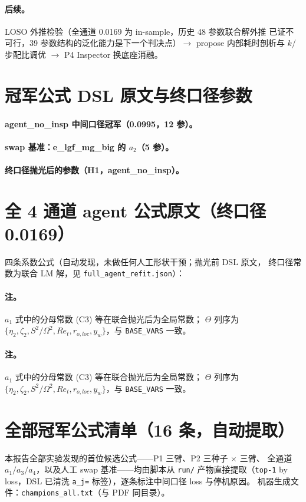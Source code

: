 \documentclass[11pt,a4paper]{ctexart}
\newcommand{\rol}{r_{o,loc}}
\newcommand{\yw}{y_w}
\newcommand{\et}{\eta_2}
\newcommand{\zt}{\zeta_2}
\newcommand{\ret}{Re_t}
\begin{document}
\paragraph{后续。}
LOSO 外推检验（全通道 0.0169 为 in-sample，历史 48 参数联合解外推
已证不可行，39 参数结构的泛化能力是下一个判决点）$\to$ propose
内部耗时剖析与 $k$/步配比调优 $\to$ P4 Inspector 换底座消融。

\appendix
\section{冠军公式 DSL 原文与终口径参数}

\paragraph{agent\_no\_insp 中间口径冠军（0.0995，12 参）。}


\paragraph{swap 基准：e\_lgf\_mg\_big 的 $a_2$（5 参）。}


\paragraph{终口径抛光后的参数（H1，agent\_no\_insp）。}


\section{全 4 通道 agent 公式原文（终口径 0.0169）}

四条系数公式（自动发现，未做任何人工形状干预；抛光前 DSL 原文，
终口径常数为联合 LM 解，见 \texttt{full\_agent\_refit.json}）：



\paragraph{注。}$a_1$ 式中的分母常数 (C3) 等在联合抛光后为全局常数；
$\Theta$ 列序为 $\{\et,\zt,S^2/\Omega^2,\ret,\rol,\yw\}$，与
\texttt{BASE\_VARS} 一致。

\paragraph{注。}$a_1$ 式中的分母常数 (C3) 等在联合抛光后为全局常数；
$\Theta$ 列序为 $\{\et,\zt,S^2/\Omega^2,\ret,\rol,\yw\}$，与
\texttt{BASE\_VARS} 一致。

\section{全部冠军公式清单（16 条，自动提取）}

本报告全部实验发现的首位候选公式——P1 三臂、P2 三种子 $\times$ 三臂、
全通道 $a_1/a_3/a_4$，以及人工 swap 基准——均由脚本从
\texttt{run/} 产物直接提取（\texttt{top-1} by loss，DSL 已清洗
\texttt{a\_j=} 标签），逐条标注中间口径 loss 与停机原因。
机器生成文件：\texttt{champions\_all.txt}（与 PDF 同目录）。

{\scriptsize}
\end{document}
